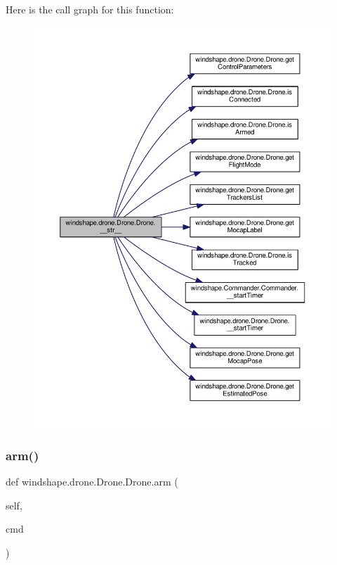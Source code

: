 Here is the call graph for this function\+:\nopagebreak
\begin{figure}[H]
\begin{center}
\leavevmode
\includegraphics[width=350pt]{classwindshape_1_1drone_1_1_drone_1_1_drone_a6c7c3a3cc6a63aec8e624febc3a40e67_cgraph}
\end{center}
\end{figure}
\mbox{\label{classwindshape_1_1drone_1_1_drone_1_1_drone_a7418f92ab851d2707ac067fbec4cc8cd}} 
\subsubsection{\texorpdfstring{arm()}{arm()}}
{\footnotesize\ttfamily def windshape.\+drone.\+Drone.\+Drone.\+arm (\begin{DoxyParamCaption}\item[{}]{self,  }\item[{}]{cmd }\end{DoxyParamCaption})}

